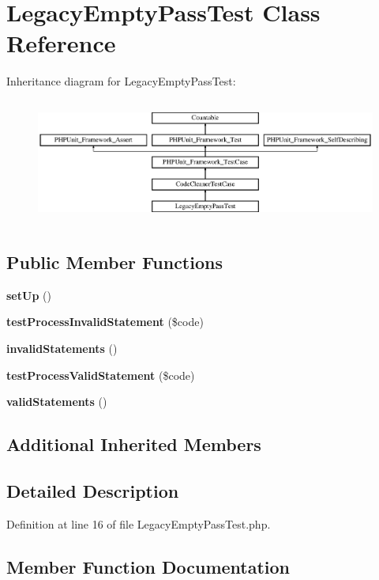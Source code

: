 \section{Legacy\+Empty\+Pass\+Test Class Reference}
\label{class_psy_1_1_test_1_1_code_cleaner_1_1_legacy_empty_pass_test}
Inheritance diagram for Legacy\+Empty\+Pass\+Test\+:\begin{figure}[H]
\begin{center}
\leavevmode
\includegraphics[height=4.129793cm]{class_psy_1_1_test_1_1_code_cleaner_1_1_legacy_empty_pass_test}
\end{center}
\end{figure}
\subsection*{Public Member Functions}
\begin{DoxyCompactItemize}
\item 
{\bf set\+Up} ()
\item 
{\bf test\+Process\+Invalid\+Statement} (\$code)
\item 
{\bf invalid\+Statements} ()
\item 
{\bf test\+Process\+Valid\+Statement} (\$code)
\item 
{\bf valid\+Statements} ()
\end{DoxyCompactItemize}
\subsection*{Additional Inherited Members}


\subsection{Detailed Description}


Definition at line 16 of file Legacy\+Empty\+Pass\+Test.\+php.



\subsection{Member Function Documentation}
